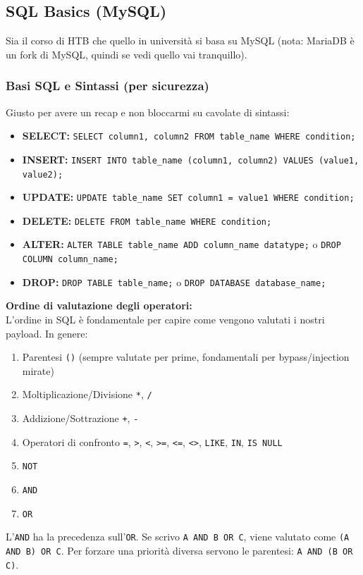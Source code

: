 \documentclass[12pt,a4paper]{report}
\begin{document}
	\subsection{SQL Basics (MySQL)}
	Sia il corso di HTB che quello in università si basa su MySQL (nota: MariaDB è un fork di MySQL, quindi se vedi quello vai tranquillo). 
	
	\subsubsection{Basi SQL e Sintassi (per sicurezza)}
	Giusto per avere un recap e non bloccarmi su cavolate di sintassi:
	\begin{itemize}
		\item \textbf{SELECT:} \texttt{SELECT column1, column2 FROM table\_name WHERE condition;}
		\item \textbf{INSERT:} \texttt{INSERT INTO table\_name (column1, column2) VALUES (value1, value2);}
		\item \textbf{UPDATE:} \texttt{UPDATE table\_name SET column1 = value1 WHERE condition;}
		\item \textbf{DELETE:} \texttt{DELETE FROM table\_name WHERE condition;}
		\item \textbf{ALTER:} \texttt{ALTER TABLE table\_name ADD column\_name datatype;} o \texttt{DROP COLUMN column\_name;}
		\item \textbf{DROP:} \texttt{DROP TABLE table\_name;} o \texttt{DROP DATABASE database\_name;}
	\end{itemize}
	
	\textbf{Ordine di valutazione degli operatori:}\\
	L'ordine in SQL è fondamentale per capire come vengono valutati i nostri payload. In genere:
	\begin{enumerate}
		\item Parentesi \texttt{()} (sempre valutate per prime, fondamentali per bypass/injection mirate)
		\item Moltiplicazione/Divisione \texttt{*}, \texttt{/}
		\item Addizione/Sottrazione \texttt{+}, \texttt{-}
		\item Operatori di confronto \texttt{=}, \texttt{>}, \texttt{<}, \texttt{>=}, \texttt{<=}, \texttt{<>}, \texttt{LIKE}, \texttt{IN}, \texttt{IS NULL}
		\item \texttt{NOT}
		\item \texttt{AND}
		\item \texttt{OR}
	\end{enumerate}
	\begin{nota}
		L'\texttt{AND} ha la precedenza sull'\texttt{OR}. Se scrivo \texttt{A AND B OR C}, viene valutato come \texttt{(A AND B) OR C}. Per forzare una priorità diversa servono le parentesi: \texttt{A AND (B OR C)}.
	\end{nota}
	
\end{document}
